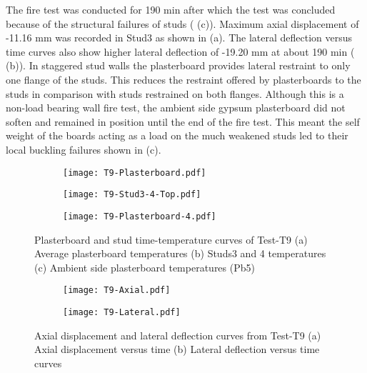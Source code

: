 The fire test was conducted for 190 min after which the test was concluded because of the structural failures of studs ( (c)). Maximum axial displacement of -11.16 mm was recorded in Stud3 as shown in  (a). The lateral deflection versus time curves also show higher lateral deflection of -19.20 mm at about 190 min ( (b)). In staggered stud walls the plasterboard provides lateral restraint to only one flange of the studs. This reduces the restraint offered by plasterboards to the studs in comparison with studs restrained on both flanges. Although this is a non-load bearing wall fire test, the ambient side gypsum plasterboard did not soften and remained in position until the end of the fire test. This meant the self weight of the boards acting as a load on the much weakened studs led to their local buckling failures shown in (c).
\begin{figure}[!htbp]
	\centering
	\begin{subfigure}[b]{0.45\textwidth}
		\centering
		\texttt{[image: T9-Plasterboard.pdf]}
		\caption{}
		\label{subfig:T9-Plasterboard}
	\end{subfigure}
	\begin{subfigure}[b]{0.45\textwidth}
		\centering
		\texttt{[image: T9-Stud3-4-Top.pdf]}
		\caption{}
		\label{subfig:T9-Studs-3-4-Mid}
	\end{subfigure}
	\begin{subfigure}[b]{0.5\textwidth}
		\centering
		\texttt{[image: T9-Plasterboard-4.pdf]}
		\caption{}
		\label{subfig:T9-Plasterboard-5}
	\end{subfigure}
	\caption{Plasterboard and stud time-temperature curves of Test-T9 (a) Average plasterboard temperatures (b) Studs3 and 4 temperatures (c) Ambient side plasterboard temperatures (Pb5) }
	\label{fig:T9-time-temperature}
\end{figure}
\begin{figure}[!htbp]
	\centering
	\begin{subfigure}[b]{0.45\textwidth}
		\centering
		\texttt{[image: T9-Axial.pdf]}
		\caption{}
		\label{subfig:T9-Axial}
	\end{subfigure}
	\begin{subfigure}[b]{0.45\textwidth}
		\centering
		\texttt{[image: T9-Lateral.pdf]}
		\caption{}
		\label{subfig:T9-Lateral}
	\end{subfigure}
	\caption{Axial displacement and lateral deflection curves from Test-T9 (a) Axial displacement versus time (b) Lateral deflection versus time curves}
	\label{fig:T9-displacement}
\end{figure}

